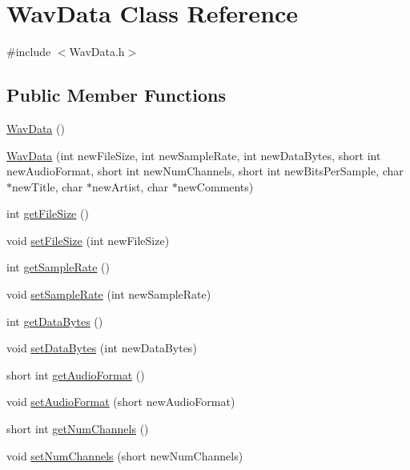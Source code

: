 \hypertarget{classWavData}{}\section{Wav\+Data Class Reference}
\label{classWavData}


{\ttfamily \#include $<$Wav\+Data.\+h$>$}

\subsection*{Public Member Functions}
\begin{DoxyCompactItemize}
\item 
\hyperlink{classWavData_a794e771764e4cc905f16a5fea4fcba48}{Wav\+Data} ()
\item 
\hyperlink{classWavData_ac1c36dbb380458c7b2be932a4fe18906}{Wav\+Data} (int new\+File\+Size, int new\+Sample\+Rate, int new\+Data\+Bytes, short int new\+Audio\+Format, short int new\+Num\+Channels, short int new\+Bits\+Per\+Sample, char $\ast$new\+Title, char $\ast$new\+Artist, char $\ast$new\+Comments)
\item 
int \hyperlink{classWavData_af9da99964b711cf96006be88c4757ecb}{get\+File\+Size} ()
\item 
void \hyperlink{classWavData_ae8e224b695a9430f270acf813c0bd012}{set\+File\+Size} (int new\+File\+Size)
\item 
int \hyperlink{classWavData_a5769f80ec72da1dc32e4d6debd4e5914}{get\+Sample\+Rate} ()
\item 
void \hyperlink{classWavData_a68f77a3b3c237f9c48640e6104410c11}{set\+Sample\+Rate} (int new\+Sample\+Rate)
\item 
int \hyperlink{classWavData_a381c10a100d7f22f94f31d9e3343da43}{get\+Data\+Bytes} ()
\item 
void \hyperlink{classWavData_aa85a563a922b0dab8ec415d8a025a167}{set\+Data\+Bytes} (int new\+Data\+Bytes)
\item 
short int \hyperlink{classWavData_a2ee1e47a093e5833807e98d246c81d98}{get\+Audio\+Format} ()
\item 
void \hyperlink{classWavData_a5574d225ec508750bdf2dc72791ab328}{set\+Audio\+Format} (short new\+Audio\+Format)
\item 
short int \hyperlink{classWavData_a3b63c1ee83b868ae73402a09d916bb48}{get\+Num\+Channels} ()
\item 
void \hyperlink{classWavData_a04c2de91d9807f47b23147b9ad905964}{set\+Num\+Channels} (short new\+Num\+Channels)
\item 

\end{DoxyCompactItemize}
